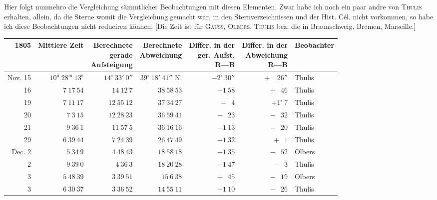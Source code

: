 \par\indent Hier folgt nunmehro die Vergleichung sämmtlicher Beobachtungen mit diesen Elementen. Zwar habe ich noch ein paar andre von \textsc{Thulis} erhalten, allein, da die Sterne womit die Vergleichung gemacht war, in den Sternverzeichnissen und der Hist. Cél. nicht vorkommen, so habe ich diese Beobachtungen nicht reduciren können. [Die Zeit ist für \textsc{Gauss}, \textsc{Olbers}, \textsc{Thulis} bez. die in Braunschweig, Bremen, Marseille.]
\begin{center}
\begingroup\fontsize{8}{10}\selectfont\setlength{\tabcolsep}{2pt}\renewcommand{\arraystretch}{1.1}
\begin{tabular}{r|r|r|r|r|r|l}
1805 & Mittlere Zeit & \shortstack{Berechnete\\gerade\\Aufsteigung} & \shortstack{Berechnete\\Abweichung} & \shortstack{Differ. in der\\ger. Aufst.\\R---B} & \shortstack{Differ. in der\\Abweichung\\R---B} & Beobachter\\ \hline
Nov. 15 & $10^{\mathrm u}\ 28^{\mathrm m}\ 13^{\mathrm s}$ & $14^\circ\ 33'\ 0''$ & $39^\circ\ 18'\ 41''$ N. & $-2'\ 30''$ & $+\phantom{1'}\ 26''$ & Thulis\\
16 & $7\ 17\ 54$ & $14\ 12\ 7$ & $38\ 58\ 53$ & $-1\ 58$ & $+\phantom{1}\ 46$ & Thulis\\
19 & $7\ 11\ 17$ & $12\ 55\ 12$ & $37\ 34\ 27$ & $-\phantom{1}\ 4$ & $+1'\ 7$ & Thulis\\
20 & $7\ 3\ 15$ & $12\ 28\ 23$ & $36\ 59\ 41$ & $-\phantom{1}\ 23$ & $-\phantom{1}\ 32$ & Thulis\\
21 & $9\ 36\ 1$ & $11\ 57\ 5$ & $36\ 16\ 16$ & $+1\ 13$ & $-\phantom{1}\ 20$ & Thulis\\
29 & $6\ 39\ 44$ & $7\ 24\ 39$ & $26\ 47\ 49$ & $+1\ 32$ & $+\phantom{1}\ 1$ & Thulis\\
Dec. 2 & $5\ 34\ 9$ & $4\ 48\ 43$ & $18\ 58\ 18$ & $+1\ 35$ & $-\phantom{1}\ 52$ & Olbers\\
2 & $9\ 39\ 0$ & $4\ 36\ 3$ & $18\ 20\ 28$ & $+1\ 47$ & $-\phantom{1}\ 3$ & Thulis\\
3 & $5\ 48\ 39$ & $3\ 39\ 51$ & $15\ 6\ 38$ & $+\phantom{1}\ 45$ & $-\phantom{1}\ 19$ & Olbers\\
3 & $6\ 30\ 37$ & $3\ 36\ 52$ & $14\ 55\ 11$ & $+1\ 10$ & $-\phantom{1}\ 26$ & Thulis\\

\end{tabular}
\end{center}
